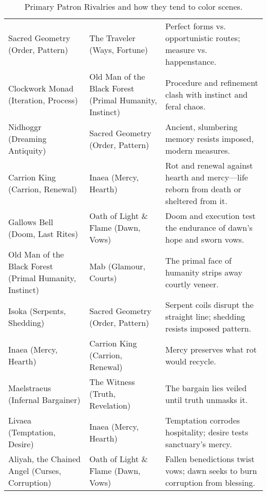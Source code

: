 \begin{table}[h!]
\begin{tabular}{@{}p{3.4cm}p{3.4cm}p{8.2cm}@{}}
    Sacred Geometry (Order, Pattern) & The Traveler (Ways, Fortune) & Perfect forms vs. opportunistic routes; measure vs. happenstance. \\
    Clockwork Monad (Iteration, Process) & Old Man of the Black Forest (Primal Humanity, Instinct) & Procedure and refinement clash with instinct and feral chaos. \\
    Nidhoggr (Dreaming Antiquity) & Sacred Geometry (Order, Pattern) & Ancient, slumbering memory resists imposed, modern measures. \\
    Carrion King (Carrion, Renewal) & Inaea (Mercy, Hearth) & Rot and renewal against hearth and mercy—life reborn from death or sheltered from it. \\
    Gallows Bell (Doom, Last Rites) & Oath of Light \& Flame (Dawn, Vows) & Doom and execution test the endurance of dawn’s hope and sworn vows. \\
    Old Man of the Black Forest (Primal Humanity, Instinct) & Mab (Glamour, Courts) & The primal face of humanity strips away courtly veneer. \\
    Isoka (Serpents, Shedding) & Sacred Geometry (Order, Pattern) & Serpent coils disrupt the straight line; shedding resists imposed pattern. \\
    Inaea (Mercy, Hearth) & Carrion King (Carrion, Renewal) & Mercy preserves what rot would recycle. \\
    Maelstraeus (Infernal Bargainer) & The Witness (Truth, Revelation) & The bargain lies veiled until truth unmasks it. \\
    Livaea (Temptation, Desire) & Inaea (Mercy, Hearth) & Temptation corrodes hospitality; desire tests sanctuary’s mercy. \\
    Aliyah, the Chained Angel (Curses, Corruption) & Oath of Light \& Flame (Dawn, Vows) & Fallen benedictions twist vows; dawn seeks to burn corruption from blessing. \\
    \bottomrule
  \end{tabular}
  \caption{Primary Patron Rivalries and how they tend to color scenes.}
\end{table}
